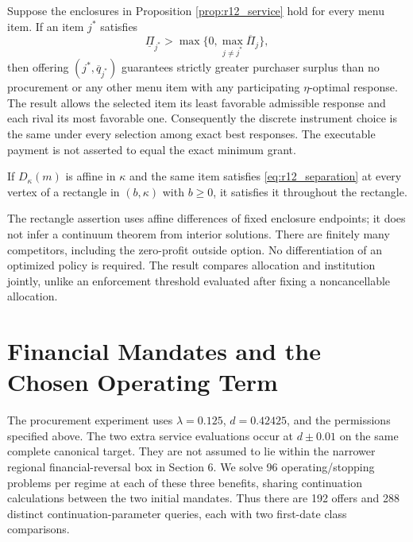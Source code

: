 \begin{theorem}
\label{thm:r12_selection}
Suppose the enclosures in Proposition \ref{prop:r12_service} hold for every menu item. If an item $j^*$ satisfies
\begin{equation}
 \underline\Pi_{j^*}>\max\{0,\max_{j\ne j^*}\overline\Pi_j\},
 \label{eq:r12_separation}
\end{equation}
then offering $(j^*,\overline q_{j^*})$ guarantees strictly greater purchaser surplus than no procurement or any other menu item with any participating $\eta$-optimal response. The result allows the selected item its least favorable admissible response and each rival its most favorable one. Consequently the discrete instrument choice is the same under every selection among exact best responses. The executable payment is not asserted to equal the exact minimum grant.

If $D_\kappa(m)$ is affine in $\kappa$ and the same item satisfies \eqref{eq:r12_separation} at every vertex of a rectangle in $(b,\kappa)$ with $b\geq0$, it satisfies it throughout the rectangle.
\end{theorem}

The rectangle assertion uses affine differences of fixed enclosure endpoints; it does not infer a continuum theorem from interior solutions. There are finitely many competitors, including the zero-profit outside option. No differentiation of an optimized policy is required. The result compares allocation and institution jointly, unlike an enforcement threshold evaluated after fixing a noncancellable allocation.

\section{Financial Mandates and the Chosen Operating Term}
\label{sec:r12_results}
The procurement experiment uses $\lambda=0.125$, $d=0.42425$, and the permissions specified above. The two extra service evaluations occur at $d\pm0.01$ on the same complete canonical target. They are not assumed to lie within the narrower regional financial-reversal box in Section 6. We solve 96 operating/stopping problems per regime at each of these three benefits, sharing continuation calculations between the two initial mandates. Thus there are 192 offers and 288 distinct continuation-parameter queries, each with two first-date class comparisons.



